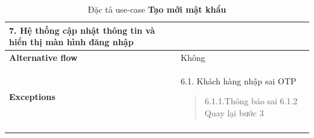 {\begin{longtable}{| p{} | p{} |}
                    7. Hệ thống cập nhật thông tin và hiển thị màn hình đăng nhập
                \\
                \hline
                    \textbf{Alternative flow}
                &
                    Không
                \\
                \hline
                    \textbf{Exceptions} 
                &
                6.1.  Khách hàng nhập sai OTP
                    \begin{quote} 
                    6.1.1.Thông báo sai
                        6.1.2 Quay lại bước 3
                    \end{quote}
                \\
                \hline
                \caption{Đặc tả use-case \textbf{Tạo mới mật khẩu}}
            \end{longtable}
        }
        
